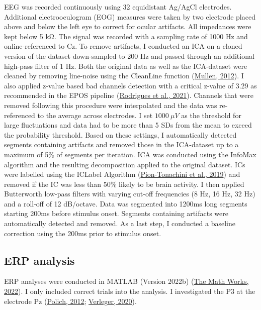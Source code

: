 \documentclass[
  man]{apa7}
\begin{document}
EEG was recorded continuously using 32 equidistant Ag/AgCl electrodes. Additional electrooculogram (EOG) measures were taken by two electrode placed above and below the left eye to correct for ocular artifacts. All impedances were kept below 5 kΩ. The signal was recorded with a sampling rate of 1000 Hz and online-referenced to Cz. To remove artifacts, I conducted an ICA on a cloned version of the dataset down-sampled to 200 Hz and passed through an additional high-pass filter of 1 Hz. Both the original data as well as the ICA-dataset were cleaned by removing line-noise using the CleanLine function (\protect\hyperlink{ref-mullen2012cleanline}{Mullen, 2012}). I also applied z-value based bad channels detection with a critical z-value of 3.29 as recommended in the EPOS pipeline (\protect\hyperlink{ref-rodrigues2021epos}{Rodrigues et al., 2021}). Channels that were removed following this procedure were interpolated and the data was re-referenced to the average across electrodes. I set \(1000 \ \mu V\) as the threshold for large fluctuations and data had to be more than 5 SDs from the mean to exceed the probability threshold. Based on these settings, I automatically detected segments containing artifacts and removed those in the ICA-dataset up to a maximum of 5\% of segments per iteration. ICA was conducted using the InfoMax algorithm and the resulting decomposition applied to the original dataset. ICs were labelled using the ICLabel Algorithm (\protect\hyperlink{ref-pion2019iclabel}{Pion-Tonachini et al., 2019}) and removed if the IC was less than 50\% likely to be brain activity. I then applied Butterworth low-pass filters with varying cut-off frequencies (8 Hz, 16 Hz, 32 Hz) and a roll-off of 12 dB/octave. Data was segmented into 1200ms long segments starting 200ms before stimulus onset. Segments containing artifacts were automatically detected and removed. As a last step, I conducted a baseline correction using the 200ms prior to stimulus onset.

\hypertarget{erp-analysis}{%
\subsection{ERP analysis}\label{erp-analysis}}

ERP analyses were conducted in MATLAB (Version 2022b) (\protect\hyperlink{ref-matlab2022b}{The Math Works, 2022}). I only included correct trials into the analysis. I investigated the P3 at the electrode Pz (\protect\hyperlink{ref-polich2012neuropsychology}{Polich, 2012}; \protect\hyperlink{ref-verleger2020effects}{Verleger, 2020}).
\end{document}
